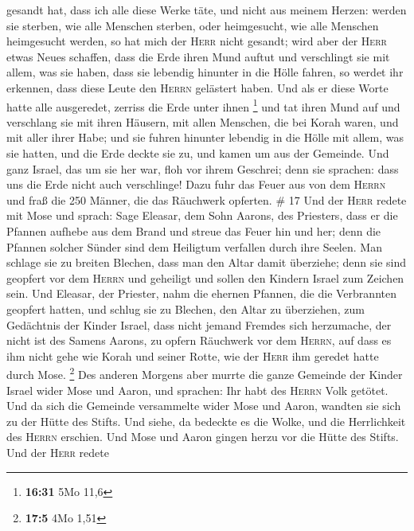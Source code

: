 gesandt hat, dass ich alle diese Werke täte, und nicht aus meinem
Herzen:  werden sie sterben, wie alle Menschen sterben,
oder heimgesucht, wie alle Menschen heimgesucht werden, so hat mich der
\textsc{Herr} nicht gesandt;  wird aber der \textsc{Herr}
etwas Neues schaffen, dass die Erde ihren Mund auftut und verschlingt
sie mit allem, was sie haben, dass sie lebendig hinunter in die Hölle
fahren, so werdet ihr erkennen, dass diese Leute den \textsc{Herrn}
gelästert haben.  Und als er diese Worte hatte alle
ausgeredet, zerriss die Erde unter ihnen \footnote{\textbf{16:31} 5Mo
  11,6}  und tat ihren Mund auf und verschlang sie mit
ihren Häusern, mit allen Menschen, die bei Korah waren, und mit aller
ihrer Habe;  und sie fuhren hinunter lebendig in die
Hölle mit allem, was sie hatten, und die Erde deckte sie zu, und kamen
um aus der Gemeinde.  Und ganz Israel, das um sie her
war, floh vor ihrem Geschrei; denn sie sprachen: dass uns die Erde nicht
auch verschlinge!  Dazu fuhr das Feuer aus von dem
\textsc{Herrn} und fraß die 250 Männer, die das Räuchwerk opferten. \#
17  Und der \textsc{Herr} redete mit Mose und sprach:
 Sage Eleasar, dem Sohn Aarons, des Priesters, dass er die
Pfannen aufhebe aus dem Brand und streue das Feuer hin und her;
 denn die Pfannen solcher Sünder sind dem Heiligtum
verfallen durch ihre Seelen. Man schlage sie zu breiten Blechen, dass
man den Altar damit überziehe; denn sie sind geopfert vor dem
\textsc{Herrn} und geheiligt und sollen den Kindern Israel zum Zeichen
sein.  Und Eleasar, der Priester, nahm die ehernen
Pfannen, die die Verbrannten geopfert hatten, und schlug sie zu Blechen,
den Altar zu überziehen,  zum Gedächtnis der Kinder
Israel, dass nicht jemand Fremdes sich herzumache, der nicht ist des
Samens Aarons, zu opfern Räuchwerk vor dem \textsc{Herrn}, auf dass es
ihm nicht gehe wie Korah und seiner Rotte, wie der \textsc{Herr} ihm
geredet hatte durch Mose. \footnote{\textbf{17:5} 4Mo 1,51}
 Des anderen Morgens aber murrte die ganze Gemeinde der
Kinder Israel wider Mose und Aaron, und sprachen: Ihr habt des
\textsc{Herrn} Volk getötet.  Und da sich die Gemeinde
versammelte wider Mose und Aaron, wandten sie sich zu der Hütte des
Stifts. Und siehe, da bedeckte es die Wolke, und die Herrlichkeit des
\textsc{Herrn} erschien.  Und Mose und Aaron gingen herzu
vor die Hütte des Stifts.  Und der \textsc{Herr} redete
